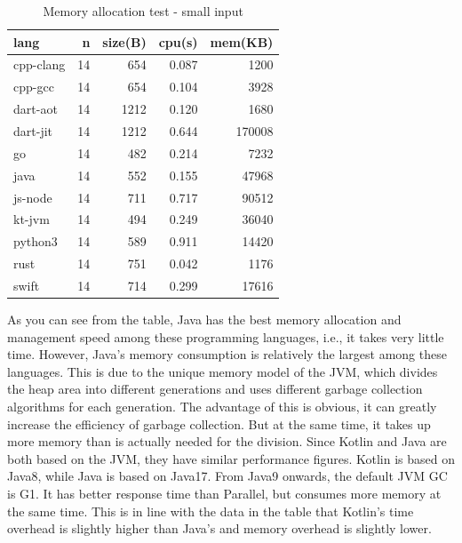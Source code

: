 \begin{table}[htbp]
    \caption{Memory allocation test - small input}
    \label{tab:binary-trees-2}
    \begin{center}
        \begin{tabular}{lrrrr}
            \toprule
            lang      & n  & size(B) & cpu(s) & mem(KB) \\
            \midrule
            cpp-clang & 14 & 654     & 0.087  & 1200    \\
            cpp-gcc   & 14 & 654     & 0.104  & 3928    \\
            dart-aot  & 14 & 1212    & 0.120  & 1680    \\
            dart-jit  & 14 & 1212    & 0.644  & 170008  \\
            go        & 14 & 482     & 0.214  & 7232    \\
            java      & 14 & 552     & 0.155  & 47968   \\
            js-node   & 14 & 711     & 0.717  & 90512   \\
            kt-jvm    & 14 & 494     & 0.249  & 36040   \\
            python3   & 14 & 589     & 0.911  & 14420   \\
            rust      & 14 & 751     & 0.042  & 1176    \\
            swift     & 14 & 714     & 0.299  & 17616   \\
            \bottomrule
        \end{tabular}
    \end{center}
\end{table}

As you can see from the table, Java has the best memory allocation and management speed among these programming languages, i.e., it takes very little time. However, Java's memory consumption is relatively the largest among these languages. This is due to the unique memory model of the JVM, which divides the heap area into different generations and uses different garbage collection algorithms for each generation. The advantage of this is obvious, it can greatly increase the efficiency of garbage collection. But at the same time, it takes up more memory than is actually needed for the division. Since Kotlin and Java are both based on the JVM, they have similar performance figures. Kotlin is based on Java8, while Java is based on Java17. From Java9 onwards, the default JVM GC is G1. It has better response time than Parallel, but consumes more memory at the same time. This is in line with the data in the table that Kotlin's time overhead is slightly higher than Java's and memory overhead is slightly lower.

